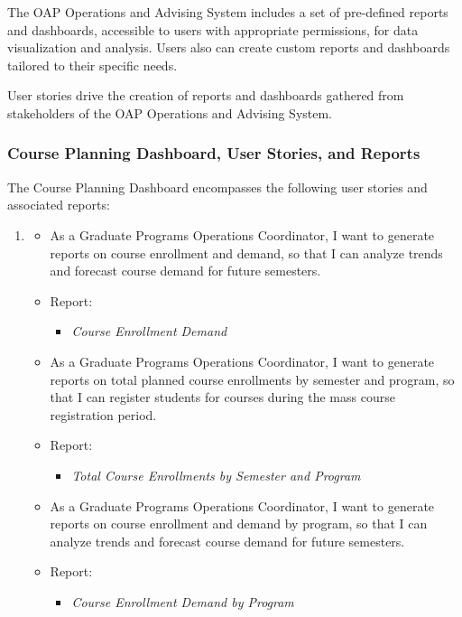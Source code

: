 \documentclass[12pt]{article}
\begin{document}
The OAP Operations and Advising System includes a set of pre-defined reports and dashboards, accessible to users with appropriate permissions, for data visualization and analysis. Users also can create custom reports and dashboards tailored to their specific needs.

User stories drive the creation of reports and dashboards gathered from stakeholders of the OAP Operations and Advising System.

\subsubsection{Course Planning Dashboard, User Stories, and Reports}
The Course Planning Dashboard encompasses the following user stories and associated reports:
\begin{enumerate}
    \item[]
    \begin{itemize}
        \item As a Graduate Programs Operations Coordinator, I want to generate reports on course enrollment and demand, so that I can analyze trends and forecast course demand for future semesters.
        \item[] Report:
            \begin{itemize}
            \item \textit{Course Enrollment Demand}
            \end{itemize}
        \item As a Graduate Programs Operations Coordinator, I want to generate reports on total planned course enrollments by semester and program, so that I can register students for courses during the mass course registration period.
        \item[] Report:
            \begin{itemize}
            \item \textit{Total Course Enrollments by Semester and Program}
            \end{itemize}
        \item As a Graduate Programs Operations Coordinator, I want to generate reports on course enrollment and demand by program, so that I can analyze trends and forecast course demand for future semesters.
        \item[] Report:
            \begin{itemize}
            \item \textit{Course Enrollment Demand by Program}
            \end{itemize}
    \end{itemize}
\end{enumerate}
\end{document}
